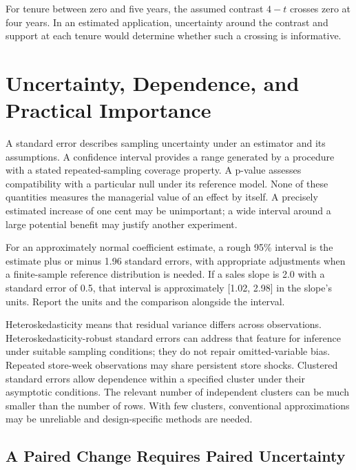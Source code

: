 For tenure between zero and five years, the assumed contrast \(4-t\)
crosses zero at four years. In an estimated application, uncertainty
around the contrast and support at each tenure would determine whether
such a crossing is informative.

\hypertarget{M03-uncertainty-dependence-and-practical-importance}{%
\section{Uncertainty, Dependence, and Practical
Importance}\label{M03-uncertainty-dependence-and-practical-importance}}

\noindent A standard error describes sampling uncertainty under an estimator and
its assumptions. A confidence interval provides a range generated by a
procedure with a stated repeated-sampling coverage property. A p-value
assesses compatibility with a particular null under its reference model.
None of these quantities measures the managerial value of an effect by
itself. A precisely estimated increase of one cent may be unimportant; a
wide interval around a large potential benefit may justify another
experiment.

For an approximately normal coefficient estimate, a rough 95\% interval
is the estimate plus or minus 1.96 standard errors, with appropriate
adjustments when a finite-sample reference distribution is needed. If a
sales slope is 2.0 with a standard error of 0.5, that interval is
approximately {[}1.02, 2.98{]} in the slope's units. Report the units
and the comparison alongside the interval.

Heteroskedasticity means that residual variance differs across
observations. Heteroskedasticity-robust standard errors can address that
feature for inference under suitable sampling conditions; they do not
repair omitted-variable bias. Repeated store-week observations may share
persistent store shocks. Clustered standard errors allow dependence
within a specified cluster under their asymptotic conditions. The
relevant number of independent clusters can be much smaller than the
number of rows. With few clusters, conventional approximations may be
unreliable and design-specific methods are needed.

\hypertarget{M03-a-paired-change-requires-paired-uncertainty}{%
\subsection{A Paired Change Requires Paired
Uncertainty}\label{M03-a-paired-change-requires-paired-uncertainty}}

